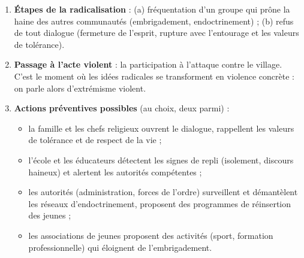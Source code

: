 \documentclass[11pt]{article}
\newcommand{\cle}[1]{{\popxbold\color{popdark}#1}}
\begin{document}
\begin{corrige}
\begin{enumerate}
\item \textbf{Étapes de la radicalisation} : (a) fréquentation d'un groupe qui prône la haine des autres communautés (embrigadement, endoctrinement) ; (b) refus de tout dialogue (fermeture de l'esprit, rupture avec l'entourage et les valeurs de tolérance).
\item \textbf{Passage à l'acte violent} : la participation à l'attaque contre le village. C'est le moment où les idées radicales se transforment en violence concrète : on parle alors d'\cle{extrémisme violent}.
\item \textbf{Actions préventives possibles} (au choix, deux parmi) :
\begin{itemize}
\item la famille et les chefs religieux ouvrent le dialogue, rappellent les valeurs de tolérance et de respect de la vie ;
\item l'école et les éducateurs détectent les signes de repli (isolement, discours haineux) et alertent les autorités compétentes ;
\item les autorités (administration, forces de l'ordre) surveillent et démantèlent les réseaux d'endoctrinement, proposent des programmes de réinsertion des jeunes ;
\item les associations de jeunes proposent des activités (sport, formation professionnelle) qui éloignent de l'embrigadement.
\end{itemize}
\end{enumerate}
\end{corrige}
\end{document}
